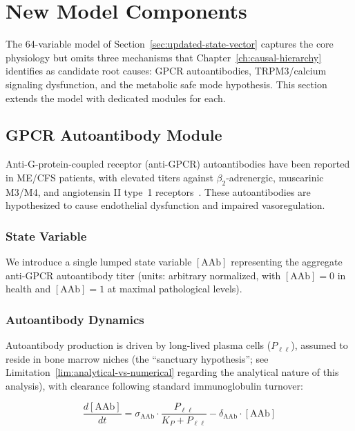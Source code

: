 \section{New Model Components}
\label{sec:new-model-components}

The 64-variable model of Section~\ref{sec:updated-state-vector} captures the core physiology but omits three mechanisms that Chapter~\ref{ch:causal-hierarchy} identifies as candidate root causes: GPCR autoantibodies, TRPM3/calcium signaling dysfunction, and the metabolic safe mode hypothesis. This section extends the model with dedicated modules for each.

\subsection{GPCR Autoantibody Module}
\label{sec:gpcr-model}

Anti-G-protein-coupled receptor (anti-GPCR) autoantibodies have been reported in ME/CFS patients, with elevated titers against $\beta_2$-adrenergic, muscarinic M3/M4, and angiotensin II type~1 receptors~\cite{Loebel2016,Sotzny2021}. These autoantibodies are hypothesized to cause endothelial dysfunction and impaired vasoregulation.

\subsubsection{State Variable}

We introduce a single lumped state variable $[\text{AAb}]$ representing the aggregate anti-GPCR autoantibody titer (units: arbitrary normalized, with $[\text{AAb}] = 0$ in health and $[\text{AAb}] = 1$ at maximal pathological levels).

\subsubsection{Autoantibody Dynamics}

Autoantibody production is driven by long-lived plasma cells ($P_{\ell\ell}$), assumed to reside in bone marrow niches (the ``sanctuary hypothesis''; see Limitation~\ref{lim:analytical-vs-numerical} regarding the analytical nature of this analysis), with clearance following standard immunoglobulin turnover:

\begin{equation}
\label{eq:aab-dynamics}
\frac{d[\text{AAb}]}{dt} = \sigma_{\text{AAb}} \cdot \frac{P_{\ell\ell}}{K_P + P_{\ell\ell}} - \delta_{\text{AAb}} \cdot [\text{AAb}]
\end{equation}

